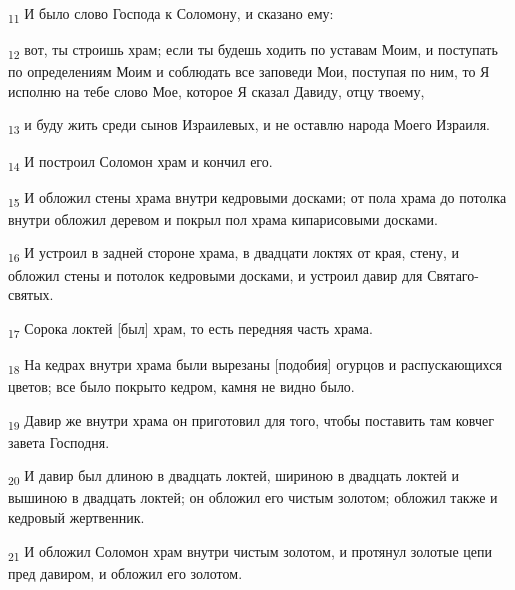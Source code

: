 \begin{tcolorbox}
\textsubscript{11} И было слово Господа к Соломону, и сказано ему:
\end{tcolorbox}
\begin{tcolorbox}
\textsubscript{12} вот, ты строишь храм; если ты будешь ходить по уставам Моим, и поступать по определениям Моим и соблюдать все заповеди Мои, поступая по ним, то Я исполню на тебе слово Мое, которое Я сказал Давиду, отцу твоему,
\end{tcolorbox}
\begin{tcolorbox}
\textsubscript{13} и буду жить среди сынов Израилевых, и не оставлю народа Моего Израиля.
\end{tcolorbox}
\begin{tcolorbox}
\textsubscript{14} И построил Соломон храм и кончил его.
\end{tcolorbox}
\begin{tcolorbox}
\textsubscript{15} И обложил стены храма внутри кедровыми досками; от пола храма до потолка внутри обложил деревом и покрыл пол храма кипарисовыми досками.
\end{tcolorbox}
\begin{tcolorbox}
\textsubscript{16} И устроил в задней стороне храма, в двадцати локтях от края, стену, и обложил стены и потолок кедровыми досками, и устроил давир для Святаго-святых.
\end{tcolorbox}
\begin{tcolorbox}
\textsubscript{17} Сорока локтей [был] храм, то есть передняя часть храма.
\end{tcolorbox}
\begin{tcolorbox}
\textsubscript{18} На кедрах внутри храма были вырезаны [подобия] огурцов и распускающихся цветов; все было покрыто кедром, камня не видно было.
\end{tcolorbox}
\begin{tcolorbox}
\textsubscript{19} Давир же внутри храма он приготовил для того, чтобы поставить там ковчег завета Господня.
\end{tcolorbox}
\begin{tcolorbox}
\textsubscript{20} И давир был длиною в двадцать локтей, шириною в двадцать локтей и вышиною в двадцать локтей; он обложил его чистым золотом; обложил также и кедровый жертвенник.
\end{tcolorbox}
\begin{tcolorbox}
\textsubscript{21} И обложил Соломон храм внутри чистым золотом, и протянул золотые цепи пред давиром, и обложил его золотом.
\end{tcolorbox}
